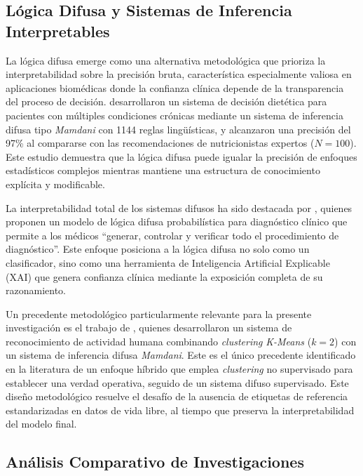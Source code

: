 \subsection{Lógica Difusa y Sistemas de Inferencia Interpretables}
\label{subsec:fuzzy_logic}

La lógica difusa emerge como una alternativa metodológica que prioriza la interpretabilidad sobre la precisión bruta, característica especialmente valiosa en aplicaciones biomédicas donde la confianza clínica depende de la transparencia del proceso de decisión. \cite{MarashiHosseini2023Dietary} desarrollaron un sistema de decisión dietética para pacientes con múltiples condiciones crónicas mediante un sistema de inferencia difusa tipo \textit{Mamdani} con 1144 reglas lingüísticas, y alcanzaron una precisión del 97\% al compararse con las recomendaciones de nutricionistas expertos ($N=100$). Este estudio demuestra que la lógica difusa puede igualar la precisión de enfoques estadísticos complejos mientras mantiene una estructura de conocimiento explícita y modificable.

La interpretabilidad total de los sistemas difusos ha sido destacada por \cite{Capitoli2025FuzzyXAI}, quienes proponen un modelo de lógica difusa probabilística para diagnóstico clínico que permite a los médicos ``generar, controlar y verificar todo el procedimiento de diagnóstico''. Este enfoque posiciona a la lógica difusa no solo como un clasificador, sino como una herramienta de Inteligencia Artificial Explicable (XAI) que genera confianza clínica mediante la exposición completa de su razonamiento.

Un precedente metodológico particularmente relevante para la presente investigación es el trabajo de \cite{Goncalves2021}, quienes desarrollaron un sistema de reconocimiento de actividad humana combinando \textit{clustering} \textit{K-Means} ($k=2$) con un sistema de inferencia difusa \textit{Mamdani}. Este es el único precedente identificado en la literatura de un enfoque híbrido que emplea \textit{clustering} no supervisado para establecer una verdad operativa, seguido de un sistema difuso supervisado. Este diseño metodológico resuelve el desafío de la ausencia de etiquetas de referencia estandarizadas en datos de vida libre, al tiempo que preserva la interpretabilidad del modelo final.


\subsection{Análisis Comparativo de Investigaciones}
\label{subsec:cuadro_comparativo}

